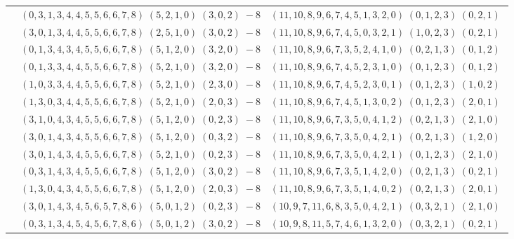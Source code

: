 \documentclass[11pt]{article}
\begin{document}
\begin{longtable}[l]{|c|c|c|}
 \cline{2-3} 
 & $(0 ,3 ,1 ,3 ,4 ,4 ,5 ,5 ,6 ,6 ,7 ,8) \;(5 ,2 ,1 ,0) \;(3 ,0 ,2) \;-8$ & $(11 ,10 ,8 ,9 ,6 ,7 ,4 ,5 ,1 ,3 ,2 ,0) \;(0 ,1 ,2 ,3) \;(0 ,2 ,1) \;$\\ 
 \cline{2-3} 
 & $(3 ,0 ,1 ,3 ,4 ,4 ,5 ,5 ,6 ,6 ,7 ,8) \;(2 ,5 ,1 ,0) \;(3 ,0 ,2) \;-8$ & $(11 ,10 ,8 ,9 ,6 ,7 ,4 ,5 ,0 ,3 ,2 ,1) \;(1 ,0 ,2 ,3) \;(0 ,2 ,1) \;$\\ 
 \cline{2-3} 
 & $(0 ,1 ,3 ,4 ,3 ,4 ,5 ,5 ,6 ,6 ,7 ,8) \;(5 ,1 ,2 ,0) \;(3 ,2 ,0) \;-8$ & $(11 ,10 ,8 ,9 ,6 ,7 ,3 ,5 ,2 ,4 ,1 ,0) \;(0 ,2 ,1 ,3) \;(0 ,1 ,2) \;$\\ 
 \cline{2-3} 
 & $(0 ,1 ,3 ,3 ,4 ,4 ,5 ,5 ,6 ,6 ,7 ,8) \;(5 ,2 ,1 ,0) \;(3 ,2 ,0) \;-8$ & $(11 ,10 ,8 ,9 ,6 ,7 ,4 ,5 ,2 ,3 ,1 ,0) \;(0 ,1 ,2 ,3) \;(0 ,1 ,2) \;$\\ 
 \cline{2-3} 
 & $(1 ,0 ,3 ,3 ,4 ,4 ,5 ,5 ,6 ,6 ,7 ,8) \;(5 ,2 ,1 ,0) \;(2 ,3 ,0) \;-8$ & $(11 ,10 ,8 ,9 ,6 ,7 ,4 ,5 ,2 ,3 ,0 ,1) \;(0 ,1 ,2 ,3) \;(1 ,0 ,2) \;$\\ 
 \cline{2-3} 
 & $(1 ,3 ,0 ,3 ,4 ,4 ,5 ,5 ,6 ,6 ,7 ,8) \;(5 ,2 ,1 ,0) \;(2 ,0 ,3) \;-8$ & $(11 ,10 ,8 ,9 ,6 ,7 ,4 ,5 ,1 ,3 ,0 ,2) \;(0 ,1 ,2 ,3) \;(2 ,0 ,1) \;$\\ 
 \cline{2-3} 
 & $(3 ,1 ,0 ,4 ,3 ,4 ,5 ,5 ,6 ,6 ,7 ,8) \;(5 ,1 ,2 ,0) \;(0 ,2 ,3) \;-8$ & $(11 ,10 ,8 ,9 ,6 ,7 ,3 ,5 ,0 ,4 ,1 ,2) \;(0 ,2 ,1 ,3) \;(2 ,1 ,0) \;$\\ 
 \cline{2-3} 
 & $(3 ,0 ,1 ,4 ,3 ,4 ,5 ,5 ,6 ,6 ,7 ,8) \;(5 ,1 ,2 ,0) \;(0 ,3 ,2) \;-8$ & $(11 ,10 ,8 ,9 ,6 ,7 ,3 ,5 ,0 ,4 ,2 ,1) \;(0 ,2 ,1 ,3) \;(1 ,2 ,0) \;$\\ 
 \cline{2-3} 
 & $(3 ,0 ,1 ,4 ,3 ,4 ,5 ,5 ,6 ,6 ,7 ,8) \;(5 ,2 ,1 ,0) \;(0 ,2 ,3) \;-8$ & $(11 ,10 ,8 ,9 ,6 ,7 ,3 ,5 ,0 ,4 ,2 ,1) \;(0 ,1 ,2 ,3) \;(2 ,1 ,0) \;$\\ 
 \cline{2-3} 
 & $(0 ,3 ,1 ,4 ,3 ,4 ,5 ,5 ,6 ,6 ,7 ,8) \;(5 ,1 ,2 ,0) \;(3 ,0 ,2) \;-8$ & $(11 ,10 ,8 ,9 ,6 ,7 ,3 ,5 ,1 ,4 ,2 ,0) \;(0 ,2 ,1 ,3) \;(0 ,2 ,1) \;$\\ 
 \cline{2-3} 
 & $(1 ,3 ,0 ,4 ,3 ,4 ,5 ,5 ,6 ,6 ,7 ,8) \;(5 ,1 ,2 ,0) \;(2 ,0 ,3) \;-8$ & $(11 ,10 ,8 ,9 ,6 ,7 ,3 ,5 ,1 ,4 ,0 ,2) \;(0 ,2 ,1 ,3) \;(2 ,0 ,1) \;$\\ 
 \cline{2-3} 
 & $(3 ,0 ,1 ,4 ,3 ,4 ,5 ,6 ,5 ,7 ,8 ,6) \;(5 ,0 ,1 ,2) \;(0 ,2 ,3) \;-8$ & $(10 ,9 ,7 ,11 ,6 ,8 ,3 ,5 ,0 ,4 ,2 ,1) \;(0 ,3 ,2 ,1) \;(2 ,1 ,0) \;$\\ 
 \cline{2-3} 
 & $(0 ,3 ,1 ,3 ,4 ,5 ,4 ,5 ,6 ,7 ,8 ,6) \;(5 ,0 ,1 ,2) \;(3 ,0 ,2) \;-8$ & $(10 ,9 ,8 ,11 ,5 ,7 ,4 ,6 ,1 ,3 ,2 ,0) \;(0 ,3 ,2 ,1) \;(0 ,2 ,1) \;$\\ 

\end{longtable}
\end{document}
